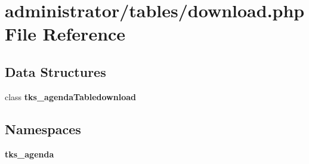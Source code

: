 \section{administrator/tables/download.php File Reference}
\label{administrator_2tables_2download_8php}
\subsection*{Data Structures}
\begin{DoxyCompactItemize}
\item 
class \textbf{ tks\+\_\+agenda\+Tabledownload}
\end{DoxyCompactItemize}
\subsection*{Namespaces}
\begin{DoxyCompactItemize}
\item 
 \textbf{ tks\+\_\+agenda}
\end{DoxyCompactItemize}

